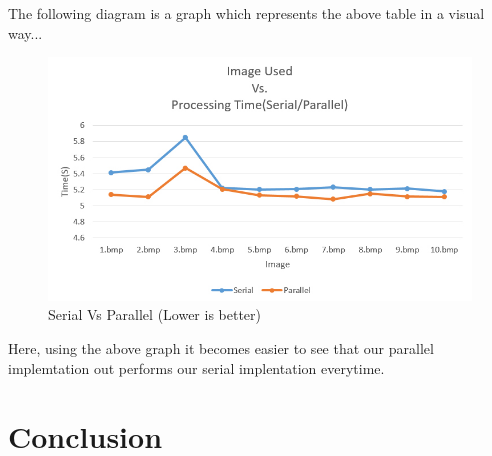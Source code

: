 \documentclass[paper=a4, fontsize=11pt]{scrartcl} %
\numberwithin{equation}{section} %
\numberwithin{figure}{section} %
\numberwithin{table}{section} %
\begin{document}
The following diagram is a graph which represents the above table in a visual way...\\


\begin{figure}[H]
	\centering
	\includegraphics[scale=0.5]{"graph1"}
	\caption{Serial Vs Parallel (Lower is better)}
        \label{graph1}
\end{figure}


Here, using the above graph it becomes easier to see that our parallel implemtation out performs our serial implentation everytime.








\section{Conclusion}
\end{document}
